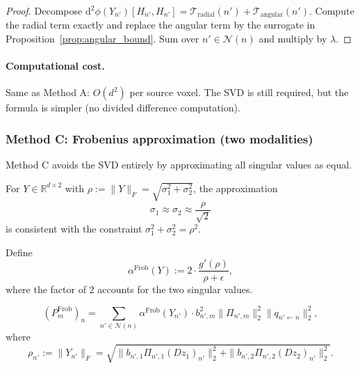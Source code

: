 \begin{proof}
Decompose $\mathrm{d}^2 \phi(Y_{n'})[H_{n'}, H_{n'}] = \mathcal{T}_{\mathrm{radial}}(n') + \mathcal{T}_{\mathrm{angular}}(n')$. Compute the radial term exactly and replace the angular term by the surrogate in Proposition~\ref{prop:angular_bound}. Sum over $n' \in \mathcal{N}(n)$ and multiply by $\lambda$.
\end{proof}

\paragraph{Computational cost.} Same as Method A: $O(d^2)$ per source voxel. The SVD is still required, but the formula is simpler (no divided difference computation).

\subsubsection{Method C: Frobenius approximation (two modalities)}
\label{subsubsec:method_C}

Method C avoids the SVD entirely by approximating all singular values as equal.

\begin{proposition}
\label{prop:equal_sv}
For $Y \in \mathbb{R}^{d \times 2}$ with $\rho := \|Y\|_F = \sqrt{\sigma_1^2 + \sigma_2^2}$, the approximation
\begin{equation}
\sigma_1 \approx \sigma_2 \approx \frac{\rho}{\sqrt{2}}
\end{equation}
is consistent with the constraint $\sigma_1^2 + \sigma_2^2 = \rho^2$.
\end{proposition}

\begin{definition}
Define
\begin{equation}
\alpha^{\mathrm{Frob}}(Y) := 2 \cdot \frac{g'(\rho)}{\rho + \epsilon},
\label{eq:alpha_frob_def}
\end{equation}
where the factor of 2 accounts for the two singular values.
\end{definition}

\begin{theorem}
\label{thm:method_C}
\begin{equation}
(P_m^{\mathrm{Frob}})_n = \sum_{n' \in \mathcal{N}(n)} \alpha^{\mathrm{Frob}}(Y_{n'}) \cdot b_{n',m}^2 \|\Pi_{n',m}\|_2^2 \|q_{n' \leftarrow n}\|_2^2,
\end{equation}
where
\begin{equation}
\rho_{n'} := \|Y_{n'}\|_F = \sqrt{\|b_{n',1} \Pi_{n',1} (D z_1)_{n'}\|_2^2 + \|b_{n',2} \Pi_{n',2} (D z_2)_{n'}\|_2^2}.
\end{equation}
\end{theorem}

